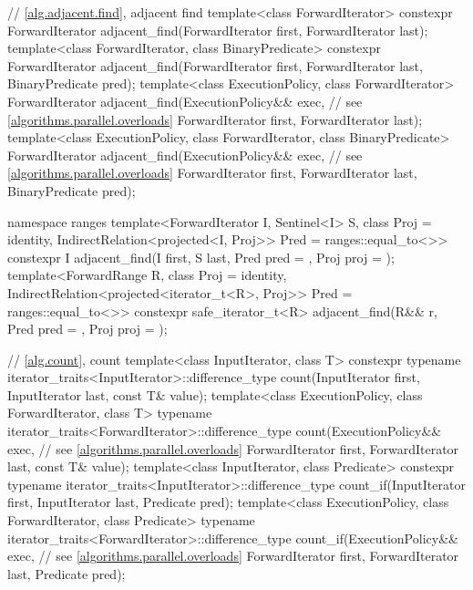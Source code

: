 \begin{codeblock}
{  // \ref{alg.adjacent.find}, adjacent find
  template<class ForwardIterator>
    constexpr ForwardIterator
      adjacent_find(ForwardIterator first, ForwardIterator last);
  template<class ForwardIterator, class BinaryPredicate>
    constexpr ForwardIterator
      adjacent_find(ForwardIterator first, ForwardIterator last,
                    BinaryPredicate pred);
  template<class ExecutionPolicy, class ForwardIterator>
    ForwardIterator
      adjacent_find(ExecutionPolicy&& exec, // see \ref{algorithms.parallel.overloads}
                    ForwardIterator first, ForwardIterator last);
  template<class ExecutionPolicy, class ForwardIterator, class BinaryPredicate>
    ForwardIterator
      adjacent_find(ExecutionPolicy&& exec, // see \ref{algorithms.parallel.overloads}
                    ForwardIterator first, ForwardIterator last,
                    BinaryPredicate pred);

  namespace ranges {
    template<ForwardIterator I, Sentinel<I> S, class Proj = identity,
        IndirectRelation<projected<I, Proj>> Pred = ranges::equal_to<>>
      constexpr I adjacent_find(I first, S last, Pred pred = {},
                                Proj proj = {});
    template<ForwardRange R, class Proj = identity,
        IndirectRelation<projected<iterator_t<R>, Proj>> Pred = ranges::equal_to<>>
      constexpr safe_iterator_t<R>
        adjacent_find(R&& r, Pred pred = {}, Proj proj = {});
  }

  // \ref{alg.count}, count
  template<class InputIterator, class T>
    constexpr typename iterator_traits<InputIterator>::difference_type
      count(InputIterator first, InputIterator last, const T& value);
  template<class ExecutionPolicy, class ForwardIterator, class T>
    typename iterator_traits<ForwardIterator>::difference_type
      count(ExecutionPolicy&& exec, // see \ref{algorithms.parallel.overloads}
            ForwardIterator first, ForwardIterator last, const T& value);
  template<class InputIterator, class Predicate>
    constexpr typename iterator_traits<InputIterator>::difference_type
      count_if(InputIterator first, InputIterator last, Predicate pred);
  template<class ExecutionPolicy, class ForwardIterator, class Predicate>
    typename iterator_traits<ForwardIterator>::difference_type
      count_if(ExecutionPolicy&& exec, // see \ref{algorithms.parallel.overloads}
               ForwardIterator first, ForwardIterator last, Predicate pred);

}
\end{codeblock}

